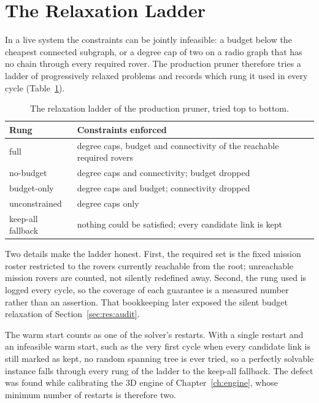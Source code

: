 \section{The Relaxation Ladder}
\label{sec:sol:ladder}

In a live system the constraints can be jointly infeasible: a budget below
the cheapest connected subgraph, or a degree cap of two on a radio graph that
has no chain through every required rover. The production pruner therefore
tries a ladder of progressively relaxed problems and records which rung it
used in every cycle (Table~\ref{tab:sol:ladder}).

\begin{table}[htbp]
\centering
\caption{The relaxation ladder of the production pruner, tried top to
bottom.}
\label{tab:sol:ladder}
\small
\begin{tabularx}{\linewidth}{@{}l X@{}}
\toprule
Rung & Constraints enforced \\
\midrule
full & degree caps, budget and connectivity of the reachable required rovers \\
no-budget & degree caps and connectivity; budget dropped \\
budget-only & degree caps and budget; connectivity dropped \\
unconstrained & degree caps only \\
keep-all fallback & nothing could be satisfied; every candidate link is kept \\
\bottomrule
\end{tabularx}
\end{table}

Two details make the ladder honest. First, the required set is the fixed
mission roster restricted to the rovers currently reachable from the root;
unreachable mission rovers are counted, not silently redefined away. Second,
the rung used is logged every cycle, so the coverage of each guarantee is a
measured number rather than an assertion. That bookkeeping later exposed the
silent budget relaxation of Section~\ref{sec:res:audit}.

\begin{remark}
The warm start counts as one of the solver's restarts. With a single restart
and an infeasible warm start, such as the very first cycle when every
candidate link is still marked as kept, no random spanning tree is ever
tried, so a perfectly solvable instance falls through every rung of the
ladder to the keep-all fallback. The defect was found while calibrating the
3D engine of Chapter~\ref{ch:engine}, whose minimum number of restarts is
therefore two.
\end{remark}

